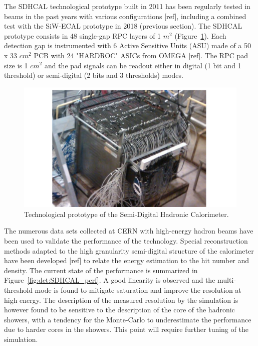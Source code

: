 The SDHCAL technological prototype built in 2011 has been regularly tested in beams in the past years with various configurations [ref], including a combined test with the SiW-ECAL prototype in 2018 (previous section). The SDHCAL prototype consists in 48 single-gap RPC layers of 1 $m^2$ (Figure~\ref{fig:det:SDHCAL_proto}). Each detection gap is instrumented with 6 Active Sensitive Units (ASU) made of a  50 x 33 $cm^2$ PCB with 24 "HARDROC" ASICs from OMEGA [ref]. The RPC pad size is 1 $cm^2$ and the pad signals can be readout either in digital (1 bit and 1 threshold) or semi-digital (2 bits and 3 thresholds) modes.

\begin{figure}[t!]
\centering
\includegraphics[width=0.8\hsize]{Detector/fig/SDHCAL_proto.jpg}
\caption{Technological prototype of the Semi-Digital Hadronic Calorimeter.}
\label{fig:det:SDHCAL_proto}
\end{figure}

The numerous data sets collected at CERN with high-energy hadron beams have been used to validate the performance of the technology. Special reconstruction methods adapted to the high granularity semi-digital structure of the calorimeter have been developed [ref] to relate the energy estimation to the hit number and density. The current state of the performance is summarized in Figure~\ref{fig:det:SDHCAL_perf}. A good linearity is observed and the multi-threshold mode is found to mitigate saturation and improve the resolution at high energy. The description of the measured resolution by the simulation is however found to be sensitive to the description of the core of the hadronic showers, with a tendency for the Monte-Carlo to underestimate the performance due to harder cores in the showers. This point will require further tuning of the simulation.

